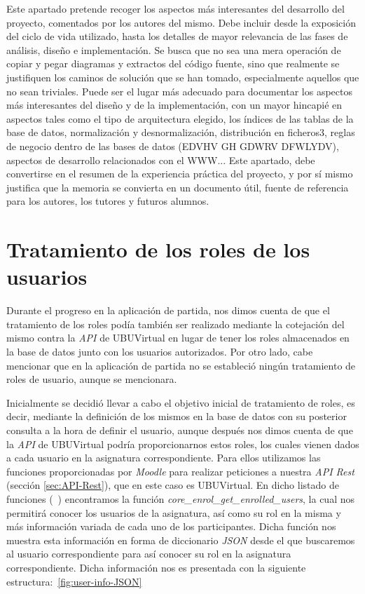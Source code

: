 
Este apartado pretende recoger los aspectos más interesantes del desarrollo del proyecto, comentados por los autores del mismo.
Debe incluir desde la exposición del ciclo de vida utilizado, hasta los detalles de mayor relevancia de las fases de análisis, diseño e implementación.
Se busca que no sea una mera operación de copiar y pegar diagramas y extractos del código fuente, sino que realmente se justifiquen los caminos de solución que se han tomado, especialmente aquellos que no sean triviales.
Puede ser el lugar más adecuado para documentar los aspectos más interesantes del diseño y de la implementación, con un mayor hincapié en aspectos tales como el tipo de arquitectura elegido, los índices de las tablas de la base de datos, normalización y desnormalización, distribución en ficheros3, reglas de negocio dentro de las bases de datos (EDVHV GH GDWRV DFWLYDV), aspectos de desarrollo relacionados con el WWW...
Este apartado, debe convertirse en el resumen de la experiencia práctica del proyecto, y por sí mismo justifica que la memoria se convierta en un documento útil, fuente de referencia para los autores, los tutores y futuros alumnos.

\section{Tratamiento de los roles de los usuarios}
Durante el progreso en la aplicación de partida, nos dimos cuenta de que el tratamiento de los roles podía también ser realizado mediante la cotejación del mismo contra la \textit{API} de UBUVirtual en lugar de tener los roles almacenados en la base de datos junto con los usuarios autorizados. Por otro lado, cabe mencionar que en la aplicación de partida no se estableció ningún tratamiento de roles de usuario, aunque se mencionara.

Inicialmente se decidió llevar a cabo el objetivo inicial de tratamiento de roles, es decir, mediante la definición de los mismos en la base de datos con su posterior consulta a la hora de definir el usuario, aunque después nos dimos cuenta de que la \textit{API} de UBUVirtual podría proporcionarnos estos roles, los cuales vienen dados a cada usuario en la asignatura correspondiente. Para ellos utilizamos las funciones proporcionadas por \textit{Moodle} para realizar peticiones a nuestra \textit{API Rest} (sección \ref{sec:API-Rest}), que en este caso es UBUVirtual. En dicho listado de funciones (~\cite{moodle:web-service-api-functions}) encontramos la función \textit{core_enrol_get_enrolled_users}, la cual nos permitirá conocer los usuarios de la asignatura, así como su rol en la misma y más información variada de cada uno de los participantes. Dicha función nos muestra esta información en forma de diccionario \textit{JSON} desde el que buscaremos al usuario correspondiente para así conocer su rol en la asignatura correspondiente. Dicha información nos es presentada con la siguiente estructura:~\ref{fig:user-info-JSON}


